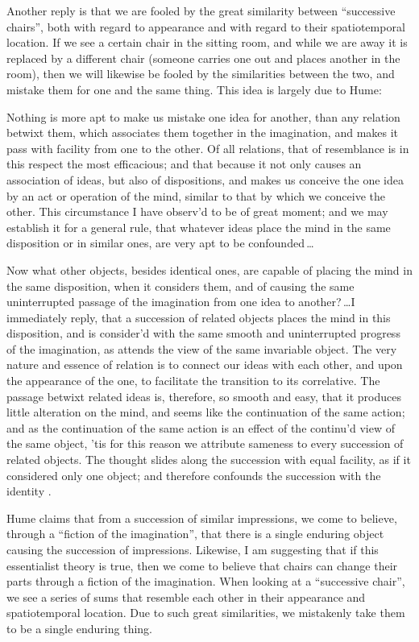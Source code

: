 \documentclass[12pt,twoside]{reedfancy}
\newenvironment{squote}{%
	\begin{spacing}{1}
	\begin{list}{}{%
	\setlength{\labelwidth}{0pt}%
	\rightmargin\leftmargin%
	}
	\item\relax
	}{%
	\end{list}%
	\end{spacing}
	}
\begin{document}
\begin{spacing}{1.25}
Another reply is that we are fooled by the great similarity between
``successive chairs'', both with regard to appearance and with regard
to their spatiotemporal location.  If we see a certain chair in the
sitting room, and while we are away it is replaced by a different
chair (someone carries one out and places another in the room), then
we will likewise be fooled by the similarities between the two, and
mistake them for one and the same thing.  This idea is largely due to
Hume:

\begin{squote}
Nothing is more apt to make us mistake one idea for another, than any
relation betwixt them, which associates them together in the
imagination, and makes it pass with facility from one to the other.
Of all relations, that of resemblance is in this respect the most
efficacious; and that because it not only causes an association of
ideas, but also of dispositions, and makes us conceive the one idea by
an act or operation of the mind, similar to that by which we conceive
the other.  This circumstance I have observ'd to be of great moment;
and we may establish it for a general rule, that whatever ideas place
the mind in the same disposition or in similar ones, are very apt to
be confounded\,\ldots

Now what other objects, besides identical ones, are capable of placing
the mind in the same disposition, when it considers them, and of
causing the same uninterrupted passage of the imagination from one
idea to another?\,\ldots I immediately reply, that a succession of
related objects places the mind in this disposition, and is consider'd
with the same smooth and uninterrupted progress of the imagination, as
attends the view of the same invariable object.  The very nature and
essence of relation is to connect our ideas with each other, and upon
the appearance of the one, to facilitate the transition to its
correlative.  The passage betwixt related ideas is, therefore, so
smooth and easy, that it produces little alteration on the mind, and
seems like the continuation of the same action; and as the
continuation of the same action is an effect of the continu'd view of
the same object, 'tis for this reason we attribute sameness to every
succession of related objects.  The thought slides along the
succession with equal facility, as if it considered only one object;
and therefore confounds the succession with the identity
\citep[135]{hume2000}.
\end{squote}

Hume claims that from a succession of similar impressions, we come to
believe, through a ``fiction of the imagination'', that there is a
single enduring object causing the succession of impressions.
Likewise, I am suggesting that if this essentialist theory is true,
then we come to believe that chairs can change their parts through a
fiction of the imagination.  When looking at a ``successive chair'',
we see a series of sums that resemble each other in their appearance
and spatiotemporal location.  Due to such great similarities, we
mistakenly take them to be a single enduring thing.


\end{spacing}
\end{document}
